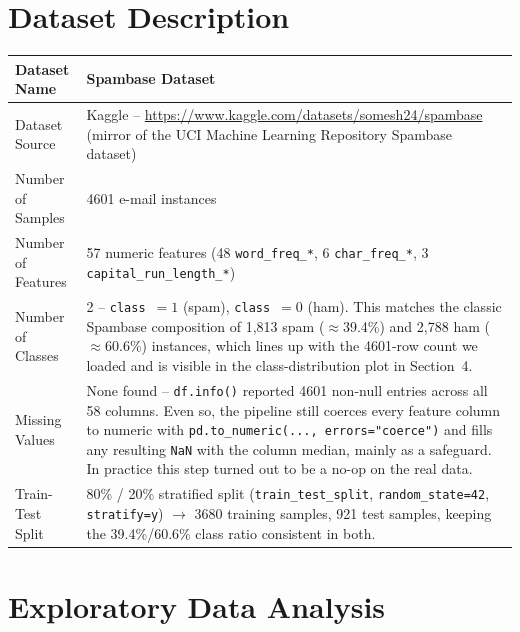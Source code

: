 \documentclass[12pt,a4paper]{article}
\begin{document}
\section{Dataset Description}

\begingroup
\small
\begin{longtable}{|p{6cm}|p{8cm}|}
\hline
Dataset Name & Spambase Dataset \\ \hline

Dataset Source & Kaggle -- \url{https://www.kaggle.com/datasets/somesh24/spambase} (mirror of the UCI Machine Learning Repository Spambase dataset) \\ \hline

Number of Samples & 4601 e-mail instances \\ \hline

Number of Features & 57 numeric features (48 \texttt{word\_freq\_*}, 6 \texttt{char\_freq\_*}, 3 \texttt{capital\_run\_length\_*}) \\ \hline

Number of Classes & 2 -- \texttt{class}~$=1$ (spam), \texttt{class}~$=0$ (ham). This matches the classic Spambase composition of 1{,}813 spam ($\approx$39.4\%) and 2{,}788 ham ($\approx$60.6\%) instances, which lines up with the 4601-row count we loaded and is visible in the class-distribution plot in Section~4. \\ \hline

Missing Values & None found -- \texttt{df.info()} reported 4601 non-null entries across all 58 columns. Even so, the pipeline still coerces every feature column to numeric with \texttt{pd.to\_numeric(..., errors="coerce")} and fills any resulting \texttt{NaN} with the column median, mainly as a safeguard. In practice this step turned out to be a no-op on the real data. \\ \hline

Train-Test Split & 80\% / 20\% stratified split (\texttt{train\_test\_split}, \texttt{random\_state=42}, \texttt{stratify=y}) $\rightarrow$ 3680 training samples, 921 test samples, keeping the 39.4\%/60.6\% class ratio consistent in both. \\ \hline

\end{longtable}
\endgroup


\section{Exploratory Data Analysis}
\end{document}

